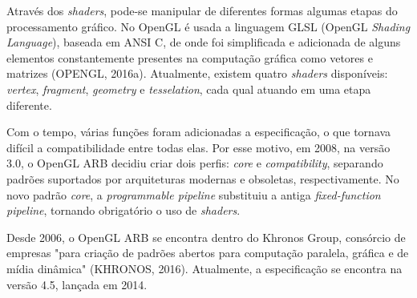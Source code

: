 Através dos \textit{shaders}, pode-se manipular de diferentes formas algumas etapas do processamento gráfico. No OpenGL é usada a linguagem GLSL (OpenGL \textit{Shading Language}), baseada em ANSI C, de onde foi simplificada e adicionada de alguns elementos constantemente presentes na computação gráfica como vetores e matrizes (OPENGL, 2016a). Atualmente, existem quatro \textit{shaders} disponíveis: \textit{vertex}, \textit{fragment}, \textit{geometry} e \textit{tesselation}, cada qual atuando em uma etapa diferente.

Com o tempo, várias funções foram adicionadas a especificação, o que tornava difícil a compatibilidade entre todas elas. Por esse motivo, em 2008, na versão 3.0, o OpenGL ARB decidiu criar dois perfis: \textit{core} e \textit{compatibility}, separando padrões suportados por arquiteturas modernas e obsoletas, respectivamente. No novo padrão \textit{core}, a \textit{programmable pipeline} substituiu a antiga \textit{fixed-function pipeline}, tornando obrigatório o uso de \textit{shaders}.

Desde 2006, o OpenGL ARB se encontra dentro do Khronos Group, consórcio de empresas "para criação de padrões abertos para computação paralela, gráfica e de mídia dinâmica" (KHRONOS, 2016). Atualmente, a especificação se encontra na versão 4.5, lançada em 2014.